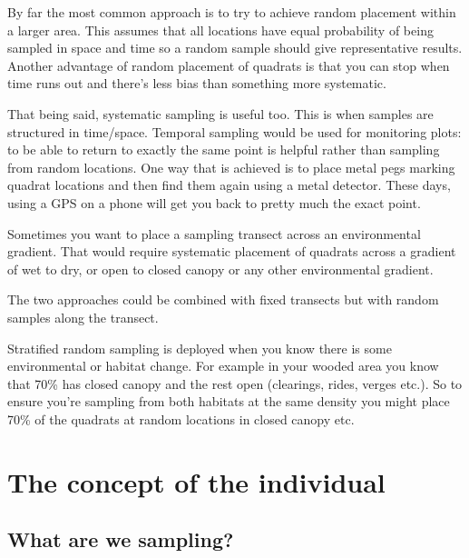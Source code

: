 \documentclass[
  letterpaper,
  DIV=11,
  numbers=noendperiod]{scrreprt}
\begin{document}
By far the most common approach is to try to achieve random placement
within a larger area. This assumes that all locations have equal
probability of being sampled in space and time so a random sample should
give representative results. Another advantage of random placement of
quadrats is that you can stop when time runs out and there's less bias
than something more systematic.

That being said, systematic sampling is useful too. This is when samples
are structured in time/space. Temporal sampling would be used for
monitoring plots: to be able to return to exactly the same point is
helpful rather than sampling from random locations. One way that is
achieved is to place metal pegs marking quadrat locations and then find
them again using a metal detector. These days, using a GPS on a phone
will get you back to pretty much the exact point.

Sometimes you want to place a sampling transect across an environmental
gradient. That would require systematic placement of quadrats across a
gradient of wet to dry, or open to closed canopy or any other
environmental gradient.

The two approaches could be combined with fixed transects but with
random samples along the transect.

Stratified random sampling is deployed when you know there is some
environmental or habitat change. For example in your wooded area you
know that 70\% has closed canopy and the rest open (clearings, rides,
verges etc.). So to ensure you're sampling from both habitats at the
same density you might place 70\% of the quadrats at random locations in
closed canopy etc.

\chapter{The concept of the individual}\label{sec-individual}

\section{What are we sampling?}\label{what-are-we-sampling}
\end{document}
